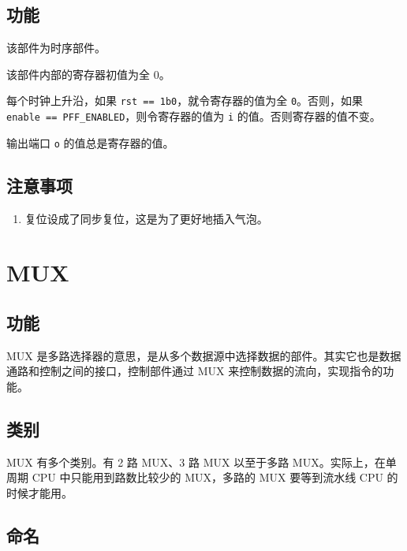 \documentclass[12pt,AutoFakeBold,AutoFakeSlant]{article}
\providecommand{\tightlist}{%
  \setlength{\itemsep}{0pt}\setlength{\parskip}{0pt}}
\begin{document}
\hypertarget{ux529fux80fd-9}{%
\subsection{功能}\label{ux529fux80fd-9}}

该部件为时序部件。

该部件内部的寄存器初值为全 0。

每个时钟上升沿，如果
\texttt{rst\ ==\ 1\textquotesingle{}b0}，就令寄存器的值为全
\texttt{0}。否则，如果
\texttt{enable\ ==\ PFF\_ENABLED}，则令寄存器的值为 \texttt{i}
的值。否则寄存器的值不变。

输出端口 \texttt{o} 的值总是寄存器的值。

\hypertarget{ux6ce8ux610fux4e8bux9879-6}{%
\subsection{注意事项}\label{ux6ce8ux610fux4e8bux9879-6}}

\begin{enumerate}
\def\labelenumi{\arabic{enumi}.}
\tightlist
\item
  复位设成了同步复位，这是为了更好地插入气泡。
\end{enumerate}

\hypertarget{mux}{%
\section{MUX}\label{mux}}

\hypertarget{ux529fux80fd-10}{%
\subsection{功能}\label{ux529fux80fd-10}}

MUX
是多路选择器的意思，是从多个数据源中选择数据的部件。其实它也是数据通路和控制之间的接口，控制部件通过
MUX 来控制数据的流向，实现指令的功能。

\hypertarget{ux7c7bux522b}{%
\subsection{类别}\label{ux7c7bux522b}}

MUX 有多个类别。有 2 路 MUX、3 路 MUX 以至于多路 MUX。实际上，在单周期
CPU 中只能用到路数比较少的 MUX，多路的 MUX 要等到流水线 CPU
的时候才能用。

\hypertarget{ux547dux540d}{%
\subsection{命名}\label{ux547dux540d}}
\end{document}
